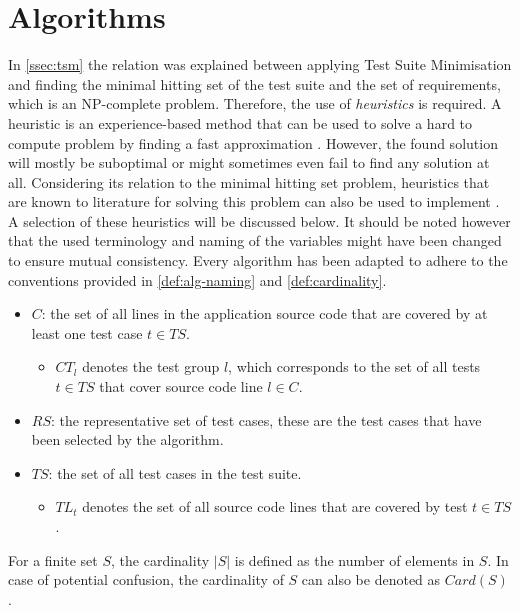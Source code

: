 
\section{Algorithms}
\label{sec:relatedwork-algorithms}
In \autoref{ssec:tsm} the relation was explained between applying Test Suite Minimisation and finding the minimal hitting set of the test suite and the set of requirements, which is an NP-complete problem. Therefore, the use of \emph{heuristics} is required. A heuristic is an experience-based method that can be used to solve a hard to compute problem by finding a fast approximation \cite{6588537}. However, the found solution will mostly be suboptimal or might sometimes even fail to find any solution at all. Considering its relation to the minimal hitting set problem, heuristics that are known to literature for solving this problem can also be used to implement \tsm{}. A selection of these heuristics will be discussed below. It should be noted however that the used terminology and naming of the variables might have been changed to ensure mutual consistency. Every algorithm has been adapted to adhere to the conventions provided in \autoref{def:alg-naming} and \autoref{def:cardinality}.

\begin{definition}
\label{def:alg-naming}
\mbox{}
\begin{itemize}
	\item $C$: the set of all lines in the application source code that are covered by at least one test case $t \in TS$.
		\begin{itemize}
			\item $CT_l$ denotes the test group $l$, which corresponds to the set of all tests $t \in TS$ that cover source code line $l \in C$.
		\end{itemize}
	\item $RS$: the representative set of test cases, these are the test cases that have been selected by the algorithm.
	\item $TS$: the set of all test cases in the test suite.
		\begin{itemize}
			\item $TL_t$ denotes the set of all source code lines that are covered by test $t \in TS$.
		\end{itemize}
\end{itemize}
\end{definition}

\begin{definition}[Cardinality]
\label{def:cardinality}
For a finite set $S$, the cardinality $|S|$ is defined as the number of elements in $S$. In case of potential confusion, the cardinality of $S$ can also be denoted as $Card(S)$.
\end{definition}

\newpage

\newpage

\newpage
